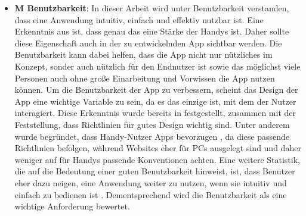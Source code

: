 \begin{itemize}
	\item \textbf{M Benutzbarkeit}: %
		In dieser Arbeit wird unter \glqq Benutzbarkeit\grqq{} verstanden, dass eine Anwendung intuitiv, einfach und effektiv nutzbar ist.\newline%
		Eine Erkenntnis aus  ist, dass genau das eine Stärke der Handys ist. Daher sollte diese Eigenschaft auch in der zu entwickelnden App sichtbar werden.\newline%
			Die Benutzbarkeit kann dabei helfen, dass die App nicht nur nützliches im Konzept, sonder auch nützlich für den Endnutzer ist sowie das möglichst viele Personen auch ohne große Einarbeitung und Vorwissen die App nutzen können.\newline%
		Um die Benutzbarkeit der App zu verbessern, scheint das Design der App eine wichtige Variable zu sein, da es das einzige ist, mit dem der Nutzer interagiert. 
				Diese Erkenntnis wurde bereits in  festgestellt, zusammen mit der Feststellung, dass Richtlinien für gutes Design wichtig sind. Unter anderem wurde begründet, dass Handy-Nutzer Apps bevorzugen \cite{pcVsphone_mobileAppVsWebTimeSpent}, da diese passende Richtlinien befolgen, während Websites eher für PCs ausgelegt sind und daher weniger auf für Handys passende Konventionen achten. %
			Eine weitere Statistik, die auf die Bedeutung einer guten Benutzbarkeit hinweist, ist, dass Benutzer eher dazu neigen, eine Anwendung weiter zu nutzen, wenn sie intuitiv und einfach zu bedienen ist \cite{pcVsphone_peopleWillRevisitMobileIfEasyToUse}.\newline%
	Dementsprechend wird die Benutzbarkeit als eine wichtige Anforderung bewertet.%
		

\end{itemize}
